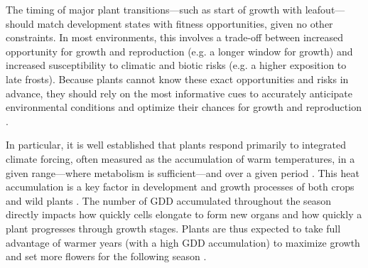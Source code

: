 \documentclass[11pt,letter]{article}
\begin{document}
The timing of major plant transitions---such as start of growth with leafout---should match development states with fitness opportunities, given no other constraints. In most environments, this involves a trade-off between %
increased opportunity for growth and reproduction
(e.g. a longer window for growth) and increased susceptibility to climatic and biotic risks (e.g. a higher exposition to late frosts). Because plants cannot know these exact opportunities and risks in advance, they should rely on the most informative cues to accurately anticipate environmental conditions and optimize their chances for growth and reproduction \citep{Chevin2015, Bonamour2019}.

In particular, it is well established that plants respond primarily to integrated climate forcing, often measured as the accumulation of warm temperatures, in a given range---where metabolism is sufficient---and over a given period \citep[growing degree-days or GDD;][]{Chuine2017}.
This heat accumulation is a key factor in development and growth processes of both crops \citep[e.g.][]{Cross1972} and wild plants \citep[e.g.][]{Hunter1992}. The number of GDD accumulated throughout the season directly impacts how quickly cells elongate to form new organs and how quickly a plant progresses through growth stages. Plants are thus expected to take full advantage of warmer years (with a high GDD accumulation) to maximize growth and set more flowers for the following season \citep{larcher1980}. 
\end{document}
